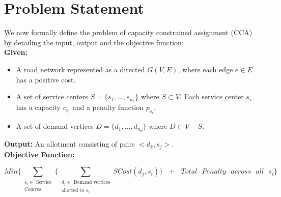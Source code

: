 \documentclass{article}
\begin{document}
\section{Problem Statement}
We now formally define the problem of capacity constrained assignment (CCA) by detailing the input, output and the objective function:\\
\textbf{Given:}
\begin{itemize}
    \item A road network represented as a directed $G(V, E)$, where each edge $e \in E$ has a positive cost.
    \item A set of service centers ${S = \{s_1, ..., s_{n_s}\}}$ where $S \subset V$. Each service center ${s_i}$ has a capacity ${c_{s_i}}$ and a penalty function ${p_{s_i}}$.
    \item A set of demand vertices $D = \{d_1, ..., d_{n_d}\}$ where $D \subset V - S$.
\end{itemize}

\begin{flushleft}
\textbf{Output:} An allotment consisting of pairs $< d_k, s_j >$.
\\
\textbf{Objective Function:}
\end{flushleft}


\[
\textbf{$Min$} 
\Bigg \{ 
    \sum_{\substack{\text{$s_i \in$ Service} \\ \text{Centres}}} 
    \Bigg \{ 
        \sum_{\substack{\text{$d_j \in$ Demand~vertices} \\ \text{allotted~to~$s_i$}}} SCost(d_j, s_i) 
    \Bigg \}
    ~~~+~~~Total~~~Penalty~~~across~~~all~~~s_i 
\Bigg \}
\tag{1}
\]








\end{document}
